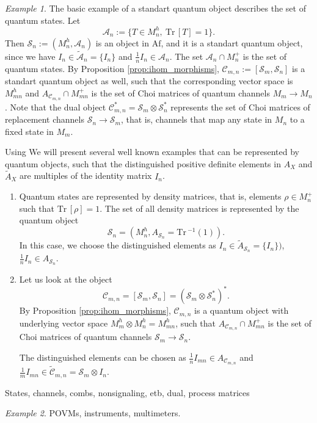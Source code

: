 \documentclass[12pt]{article}
\theoremstyle{definition}
\theoremstyle{remark}
\newtheorem{exm}{Example}
\def\Ce{\mathcal C}
\def \Tr{\mathrm{Tr}\,}
\def\Se {\mathcal S}
\def \Af{\mathrm{Af}}
\begin{document}
\begin{exm}\label{exm:quantum_maps} The basic example of a standart quantum object
describes the set of quantum states. Let  
\[
\mathcal A_n:=\{T\in M_n^h, \ \Tr[T]=1\}.
\]
Then $\Se_n:=(M_n^h,\mathcal A_n)$ is an object in $\Af$, and it is a standart quantum object, since we have 
 $I_n\in \tilde {\mathcal A}_n=\{I_n\}$ and $\frac 1n I_n\in
\mathcal A_n$. 
The set $\mathcal A_n\cap M_n^+$ is the set of quantum states. By Proposition
\ref{prop:ihom_morphisms}, $\Ce_{m,n}:=[\Se_m,\Se_n]$ is a standart quantum object as well, such
that the corresponding vector space is $M_{mn}^h$ and $A_{\Ce_{m,n}}\cap M_{mn}^+$ is the set
of Choi matrices of quantum channels $M_m\to M_n$. Note that the dual object
$\Ce^*_{m,n}=\Se_m\otimes \Se_n^*$ represents the set of Choi matrices of replacement
channels $\Se_n\to \Se_m$, that is, channels that map any state in $M_n$ to a fixed state
in $M_m$. 



Using 
We will present several well known examples that can
be represented by quantum objects, such that the distinguished positive definite elements
in $A_X$ and $\tilde A_X$ are multiples of the identity matrix $I_n$. 
\begin{enumerate}
\item Quantum states are represented by density matrices, that is, elements $\rho\in
M_n^+$ such that $\Tr[\rho]=1$. The set of all density matrices is represented by the
quantum object 
\[
\mathcal S_n=(M_n^h, A_{\mathcal S_n}=\Tr^{-1}(1)).
\]
In this case, we choose the distinguished
elements as $I_n\in \tilde A_{\Se_n}=\{I_n\})$, $\frac1n I_n\in A_{\Se_n}$.
\item Let us look at the object 
\[
\Ce_{m,n}=[\Se_m,\Se_n]=(\Se_m\otimes \Se_n^*)^*.
\]
By
Proposition  \ref{prop:ihom_morphisms}, $\Ce_{m,n}$ is a quantum object with underlying
vector space $M_m^h\otimes M_n^h=M_{mn}^h$, such that 
$A_{\Ce_{m,n}}\cap M_{mn}^+$ is the set of Choi matrices of quantum channels $\Se_m\to
\Se_n$. 


The distinguished elements can be chosen as  $\frac1n I_{mn} \in A_{\Ce_{m,n}}$ and 
$\frac1m I_{mn}\in \tilde {\mathcal C}_{m,n}=\Se_m\otimes I_n$.
\end{enumerate}


States, channels, combs, nonsignaling, etb, dual, process
matrices

\end{exm}

\begin{exm}\label{exm:qccq} POVMs, instruments, multimeters.


\end{exm}
\end{document}
